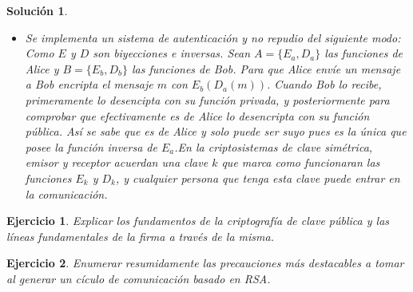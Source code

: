 \documentclass[
  a4paper,
  spanish,
  12pt,
]{scrartcl}
\theoremstyle{ejercicio-style}
\newtheorem{ejer}{Ejercicio}
\theoremstyle{remark-style}
\newtheorem*{sol}{Solución}
\begin{document}
\begin{sol}
\begin{itemize}
\item Se implementa un sistema de autenticación y no repudio del siguiente modo: Como $E$ y $D$ son biyecciones e inversas. Sean $A = \{ E_a, D_a \}$ las funciones de Alice y $B = \{ E_b, D_b \}$ las funciones de Bob. Para que Alice envíe un mensaje a Bob encripta el mensaje $m$ con $E_b(D_a(m))$. Cuando Bob lo recibe, primeramente lo desencipta con su función privada, y posteriormente para comprobar que efectivamente es de Alice lo desencripta con su función pública. Así se sabe que es de Alice y solo puede ser suyo pues es la única que posee la función inversa de $E_a$.En la criptosistemas de clave simétrica, emisor y receptor acuerdan una clave $k$ que marca como funcionaran las funciones $E_k$ y $D_k$, y cualquier persona que tenga esta clave puede entrar en la comunicación.
\end{itemize}
\end{sol}

\begin{ejer}
  Explicar los fundamentos de la criptografía de clave pública y las líneas fundamentales de la firma a través de la misma.
\end{ejer}

\begin{ejer}
  Enumerar resumidamente las precauciones más destacables a tomar al generar un cículo de comunicación basado en RSA.
\end{ejer}
\end{document}
